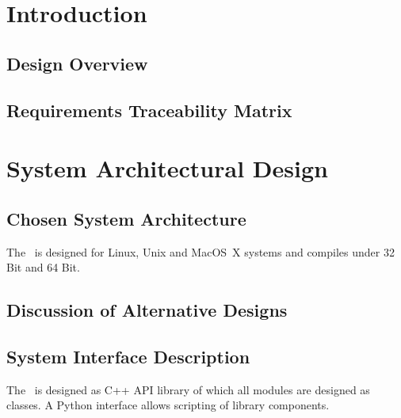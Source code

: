 \documentclass{article}[12pt,a4]
\begin{document}
\frontpage


\section{Introduction}

\subsection{Design Overview}

\subsection{Requirements Traceability Matrix}


\section{System Architectural Design}

\subsection{Chosen System Architecture}

The \this\ is designed for Linux, Unix and MacOS~X systems and compiles under
32 Bit and 64 Bit.

\subsection{Discussion of Alternative Designs}

\subsection{System Interface Description}

The \this\ is designed as C++ API library of which all modules are designed as classes.
A Python interface allows scripting of library components.


\end{document}
